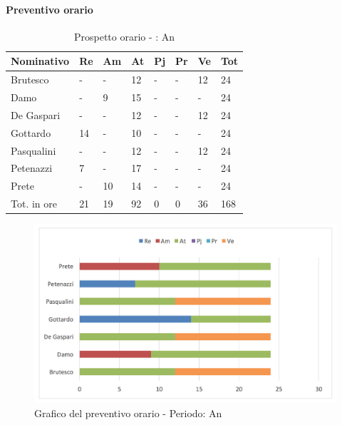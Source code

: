			\paragraph{Preventivo orario}
							\begin{table}[H] \begin{center} \begin{tabular}{llllllll}
							\toprule
							\textbf{Nominativo}	&	\textbf{Re}	&	\textbf{Am}	&	\textbf{At}	&	\textbf{Pj}	&	\textbf{Pr}	&	\textbf{Ve}	&	\textbf{Tot}\\
							\midrule
							Brutesco	&	-	&	-	&	12	&	-	&	-	&	12	&	24	 \\
							Damo		&	-	&	9	&	15	&	-	&	-	&	-	&	24	 \\
							De Gaspari	&	-	&	-	&	12	&	-	&	-	&	12	&	24	 \\
							Gottardo	&	14	&	-	&	10	&	-	&	-	&	-	&	24	 \\
							Pasqualini	&	-	&	-	&	12	&	-	&	-	&	12	&	24	 \\
							Petenazzi	&	7	&	-	&	17	&	-	&	-	&	-	&	24	 \\
							Prete		&	-	&	10	&	14	&	-	&	-	&	-	&	24	 \\
							\midrule
							Tot. in ore	&	21	&	19	&	92	&	0	&	0	&	36	&	168	 \\

							\bottomrule
							\end{tabular} \end{center} \caption{Prospetto orario - :
							An
							}\label{tab:h_An} \end{table}

								\begin{figure}[H]  \centering  \includegraphics[scale=0.35]{img/h_An}
									\caption{Grafico del preventivo orario - Periodo: An}  \label{fig:h_An"} 		\end{figure}


